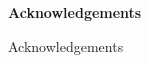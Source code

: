 \thispagestyle{empty}
\vspace{8cm}
\noindent
{\centerline {\bf \large Acknowledgements}}
\vspace{1cm}
\noindent

Acknowledgements
